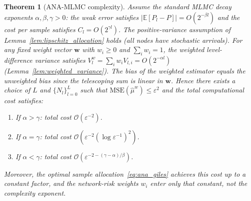 \documentclass{ieeeaccess}
\newtheorem{theorem}{Theorem}
\begin{document}
\begin{theorem}[ANA-MLMC complexity]
\label{thm:complexity}
Assume the standard MLMC decay exponents $\alpha,\beta,\gamma>0$: the weak error satisfies
$|\mathbb{E}[P_l-P]|=O(2^{-\beta l})$ and the cost per sample satisfies
$C_l=O(2^{\gamma l})$. The positive-variance assumption of Lemma~\ref{lem:lipschitz_allocation}
holds (all nodes have stochastic arrivals). For any fixed weight vector $\mathbf{w}$ with $w_i\geq0$
and $\sum_iw_i=1$, the weighted level-difference variance satisfies
$V_l^w=\sum_iw_iV_{l,i}=O(2^{-\alpha l})$ (Lemma~\ref{lem:weighted_variance}). The bias
of the weighted estimator equals the unweighted bias since the telescoping sum is linear
in $\mathbf{w}$. Hence there exists a choice of $L$ and $\{N_l\}_{l=0}^L$ such that
$\mathrm{MSE}(\hat{\mu}^w)\leq\varepsilon^2$ and the total computational cost satisfies:
\begin{enumerate}
  \item[{\rm (i)}] If $\alpha>\gamma$: total cost $\mathcal{O}(\varepsilon^{-2})$.
  \item[{\rm (ii)}] If $\alpha=\gamma$: total cost
  $\mathcal{O}\!\left(\varepsilon^{-2}(\log\varepsilon^{-1})^2\right)$.
  \item[{\rm (iii)}] If $\alpha<\gamma$: total cost
  $\mathcal{O}\!\left(\varepsilon^{-2-(\gamma-\alpha)/\beta}\right)$.
\end{enumerate}
Moreover, the optimal sample allocation~\eqref{eq:ana_giles} achieves this cost up to a
constant factor, and the network-risk weights $w_i$ enter only that constant, not the complexity
exponent.
\end{theorem}
\end{document}
